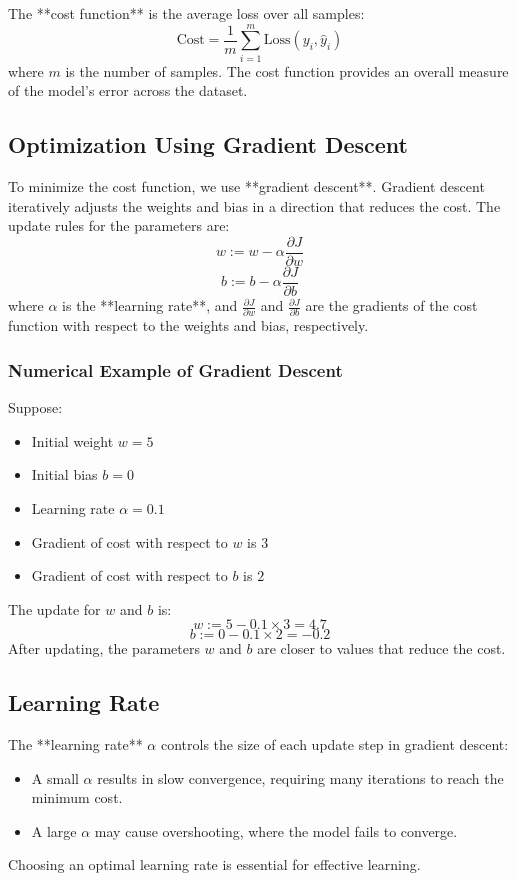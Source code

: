 \documentclass{article}
\begin{document}
The **cost function** is the average loss over all samples:
\[
\text{Cost} = \frac{1}{m} \sum_{i=1}^{m} \text{Loss}(y_i, \hat{y}_i)
\]
where $m$ is the number of samples. The cost function provides an overall measure of the model's error across the dataset.

\subsection{Optimization Using Gradient Descent}
To minimize the cost function, we use **gradient descent**. Gradient descent iteratively adjusts the weights and bias in a direction that reduces the cost. The update rules for the parameters are:
\[
w := w - \alpha \frac{\partial J}{\partial w}
\]
\[
b := b - \alpha \frac{\partial J}{\partial b}
\]
where $\alpha$ is the **learning rate**, and $\frac{\partial J}{\partial w}$ and $\frac{\partial J}{\partial b}$ are the gradients of the cost function with respect to the weights and bias, respectively.

\subsubsection{Numerical Example of Gradient Descent}
Suppose:
\begin{itemize}
    \item Initial weight $w = 5$
    \item Initial bias $b = 0$
    \item Learning rate $\alpha = 0.1$
    \item Gradient of cost with respect to $w$ is $3$
    \item Gradient of cost with respect to $b$ is $2$
\end{itemize}
The update for $w$ and $b$ is:
\[
w := 5 - 0.1 \times 3 = 4.7
\]
\[
b := 0 - 0.1 \times 2 = -0.2
\]
After updating, the parameters $w$ and $b$ are closer to values that reduce the cost.

\subsection{Learning Rate}
The **learning rate** $\alpha$ controls the size of each update step in gradient descent:
\begin{itemize}
    \item A small $\alpha$ results in slow convergence, requiring many iterations to reach the minimum cost.
    \item A large $\alpha$ may cause overshooting, where the model fails to converge.
\end{itemize}
Choosing an optimal learning rate is essential for effective learning.
\end{document}
